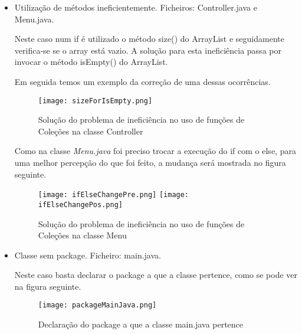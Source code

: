 \begin{itemize}
\item Utilização de métodos ineficientemente.\newline
 Ficheiros: Controller.java e Menu.java.\newline


\par Neste caso num if é utilizado o método size() do ArrayList e seguidamente verifica-se se o array está vazio. A solução para esta ineficiência passa por invocar o método isEmpty() do ArrayList.\newline
\par Em seguida temos um exemplo da correção de uma dessas ocorrências. 
\begin{figure}[H]

  \centering

  \texttt{[image: sizeForIsEmpty.png]}

  \caption {Solução do problema de ineficiência no uso de funções de Coleções na classe Controller}

  \label {fig17}

\end{figure}


\par Como na classe \textit{Menu.java} foi preciso trocar a execução do if com o else, para uma melhor percepção do que foi feito, a mudança será mostrada no figura seguinte.

\begin{figure}[H]

  \centering

  \texttt{[image: ifElseChangePre.png]}
  \texttt{[image: ifElseChangePos.png]}

  \caption {Solução do problema de ineficiência no uso de funções de Coleções na classe Menu}

  \label {fig18}

\end{figure}

\end{itemize}

\begin{itemize}
\item Classe sem package.\newline
 Ficheiro: main.java.\newline


\par Neste caso basta declarar o package a que a classe pertence, como se pode ver na figura seguinte.\newline 

\begin{figure}[H]

  \centering

  \texttt{[image: packageMainJava.png]}

  \caption {Declaração do package a que a classe main.java pertence}

  \label {fig19}

\end{figure}

\end{itemize}

